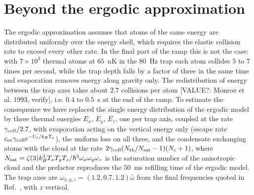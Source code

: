 \section{Beyond the ergodic approximation}
\label{sec:aniso}
The ergodic approximation assumes that atoms of the same energy are
distributed uniformly over the energy shell, which requires the elastic
collision rate to exceed every other rate. In the final part of the ramp this
is not the case: with $7\times10^3$ thermal atoms at $65$~nK in the $80$~Hz
trap each atom collides $5$ to $7$ times per second, while the trap depth
falls by a factor of three in the same time and evaporation removes energy
along gravity only. The redistribution of energy between the trap axes takes
about $2.7$ collisions per atom [VALUE?: Monroe et al. 1993, verify], i.e.
$0.4$ to $0.5$~s at the end of the ramp. To estimate the consequence we have
replaced the single energy distribution of the ergodic model by three thermal
energies $E_x$, $E_y$, $E_z$, one per trap axis, coupled at the rate
$\gamma_{\rm coll}/2.7$, with evaporation acting on the vertical energy only
(escape rate $c_{\rm ev}\gamma_{\rm coll}e^{-U_t/k_BT_z}$), the uniform loss
on all three, and the condensate exchanging atoms with the cloud at the rate
$2\gamma_{\rm coll}(N_{\rm th}/N_{\rm sat}-1)(N_c+1)$, where
$N_{\rm sat}=\zeta(3)k_B^3T_xT_yT_z/\hbar^3\omega_x\omega_y\omega_z$ is the
saturation number of the anisotropic cloud and the prefactor reproduces the
$50$~ms refilling time of the ergodic model. The trap axes are
$\omega_{x,y,z}=(1.2,0.7,1.2)\bar\omega$ from the final frequencies quoted in
Ref.~\cite{MelladoMunoz2020}, with $z$ vertical.

